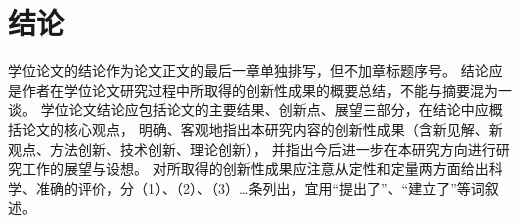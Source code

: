 

\chapter*{结\quad 论}

学位论文的结论作为论文正文的最后一章单独排写，但不加章标题序号。 结论应是作者在学位论文研究过程中所取得的创新性成果的概要总结，不能与摘要混为一谈。
学位论文结论应包括论文的主要结果、创新点、展望三部分，在结论中应概括论文的核心观点，
明确、客观地指出本研究内容的创新性成果（含新见解、新观点、方法创新、技术创新、理论创新），
并指出今后进一步在本研究方向进行研究工作的展望与设想。
对所取得的创新性成果应注意从定性和定量两方面给出科学、准确的评价，分（1）、（2）、（3）…条列出，宜用“提出了”、“建立了”等词叙述。 